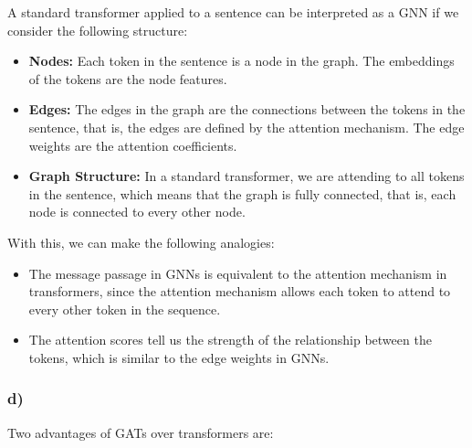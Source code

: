 \documentclass{article}
\begin{document}
A standard transformer applied to a sentence can be interpreted as a GNN if we consider the following structure: 

\begin{itemize}
    \item \textbf{Nodes:} Each token in the sentence is a node in the graph. The embeddings of the tokens are the node features.
    \item \textbf{Edges:} The edges in the graph are the connections between the tokens in the sentence, that is, the edges are defined by the attention mechanism.
The edge weights are the attention coefficients.
    \item \textbf{Graph Structure:} In a standard transformer, we are attending to all tokens in the sentence, which means that the graph is fully connected, that is,
each node is connected to every other node.
\end{itemize}

With this, we can make the following analogies:

\begin{itemize}
    \item The message passage in GNNs is equivalent to the attention mechanism in transformers, since the attention mechanism allows each token to attend to every other token in the sequence.
    \item The attention scores tell us the strength of the relationship between the tokens, which is similar to the edge weights in GNNs.
\end{itemize}

\subsubsection*{d)}

Two advantages of GATs over transformers are:
\end{document}
